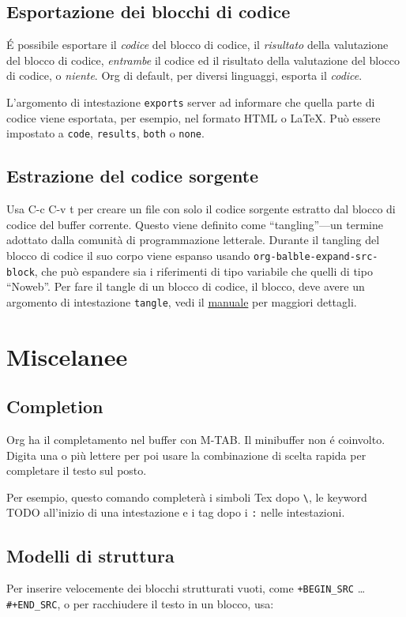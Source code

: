 \documentclass[11pt]{article}
\begin{document}
\subsection*{Esportazione dei blocchi di codice}
\label{sec:org172dff4}
É possibile esportare il \emph{codice} del blocco di codice, il \emph{risultato}
della valutazione del blocco di codice, \emph{entrambe} il codice ed il
risultato della valutazione del blocco di codice, o \emph{niente}. Org di
default, per diversi linguaggi, esporta il \emph{codice}.

L'argomento di intestazione \texttt{exports} server ad informare che quella
parte di codice viene esportata, per esempio, nel formato HTML o
\LaTeX{}. Può essere impostato a \texttt{code}, \texttt{results}, \texttt{both} o \texttt{none}.

\subsection*{Estrazione del codice sorgente}
\label{sec:orgffc8e33}
Usa C-c C-v t per creare un file con solo il codice
sorgente estratto dal blocco di codice del buffer corrente. Questo
viene definito come ``tangling''---un termine adottato dalla comunità di
programmazione letterale. Durante il tangling del blocco di codice il
suo corpo viene espanso usando \texttt{org-balble-expand-src-block}, che può
espandere sia i riferimenti di tipo variabile che quelli di tipo
``Noweb''. Per fare il tangle di un blocco di codice, il blocco, deve
avere un argomento di intestazione \texttt{tangle}, vedi il \href{manual}{manuale} per
maggiori dettagli.

\section{Miscelanee}
\label{sec:org62c1089}
\subsection*{Completion}
\label{sec:org2ef7f0e}
Org ha il completamento nel buffer con M-TAB. Il minibuffer
non é coinvolto. Digita una o più lettere per poi usare la
combinazione di scelta rapida per completare il testo sul posto.

Per esempio, questo comando completerà i simboli Tex dopo \texttt{\textbackslash{}}, le
keyword TODO all'inizio di una intestazione e i tag dopo i \texttt{:} nelle
intestazioni.

\subsection*{Modelli di struttura}
\label{sec:orgcea2100}
Per inserire velocemente dei blocchi strutturati vuoti, come
\texttt{+BEGIN\_SRC} \ldots{} \texttt{\#+END\_SRC}, o per racchiudere il testo in un blocco,
usa:
\end{document}
